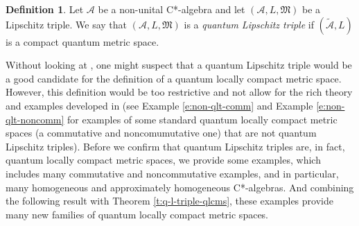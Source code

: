 \documentclass{amsart}
\theoremstyle{plain}
\theoremstyle{definition}
\newtheorem{definition}[theorem]{Definition}
\theoremstyle{remark}
\numberwithin{equation}{section}
\newcommand{\A}{{\mathcal{A}}}
\newcommand{\wt}[1]{{\widetilde{#1}}}
\newcommand{\M}{{\mathfrak{M}}}
\begin{document}
\begin{definition}\label{d:q-l-triple}
    Let $\A$ be a non-unital C*-algebra and let $(\A, L,\M)$ be a Lipschitz triple. We say that $(\A, L,\M)$ is a {\em quantum Lipschitz triple} if $(\wt{\A}, L)$ is a compact quantum metric space.
\end{definition}
Without looking at \cite{Latremoliere12b}, one might suspect that a quantum Lipschitz triple would be a good candidate for the definition of a quantum locally compact metric space. However, this definition would be too restrictive and not allow for the rich theory and examples developed in \cite{Latremoliere12b, Latremoliere25} (see Example \ref{e:non-qlt-comm} and Example \ref{e:non-qlt-noncomm} for   examples of some standard quantum locally compact metric spaces (a commutative and noncomumutative one)  that are not  quantum Lipschitz triples). Before we confirm that quantum Lipschitz triples are, in fact, quantum locally compact metric spaces, we provide some examples, which includes many commutative and noncommutative examples, and in particular, many homogeneous and approximately homogeneous C*-algebras. And combining the following result with Theorem \ref{t:q-l-triple-qlcms}, these examples provide many new families of quantum locally compact metric spaces.
\end{document}
